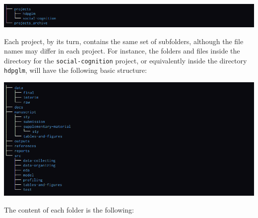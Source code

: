 \documentclass[a4paper]{article}
\begin{document}
\begin{center}
\includegraphics[width=1\textwidth]{./project-management/project-structure-master.png}
\end{center}


Each project, by its turn, contains the same set of subfolders, although the file names may differ in each project. For instance, the folders and files inside the directory for the \texttt{social-cognition} project, or equivalently inside the directory \texttt{hdpglm}, will have the following basic structure:

\begin{center}
\includegraphics[width=1\textwidth]{./project-management/project-structure.png}
\end{center}

The content of each folder is the following:
\end{document}
